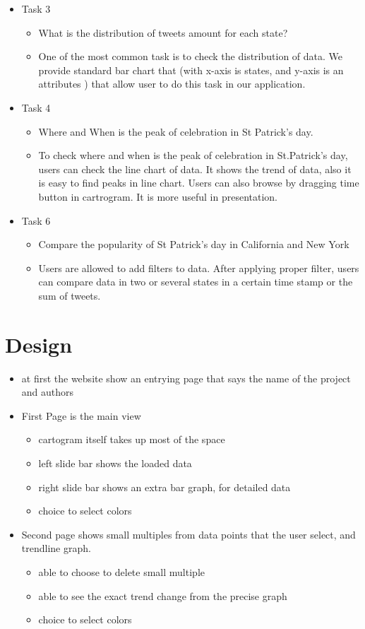 \documentclass[journal]{vgtc}                %
\begin{document}
\begin{itemize}
\item Task 3
\begin{itemize}
\item What is the distribution of tweets amount for each state?
\item One of the most common task is to check the distribution of data. We provide standard bar chart that (with x-axis is states, and y-axis is an attributes ) that allow user to do this task in our application. 
\end{itemize}
\item Task 4
\begin{itemize}
\item Where and When is the peak of celebration in St Patrick's day. 
\item To check where and when is the peak of celebration in St.Patrick's day, users can check the line chart of data. It shows the trend of data, also it is easy to find peaks in line chart. Users can also browse by dragging time button in cartrogram. It is more useful in presentation.
\end{itemize}
\item Task 6
\begin{itemize}
\item Compare the popularity of St Patrick's day in California and New York
\item Users are allowed to add filters to data. After applying proper filter, users can compare data in two or several states in a certain time stamp or the sum of tweets. 
\end{itemize}
\end{itemize}

\section{Design}
\begin{itemize}
\item at first the website show an entrying page that says the name of the project and authors
\item First Page is the main view
\begin{itemize}
\item cartogram itself takes up most of the space
\item left slide bar shows the loaded data
\item right slide bar shows an extra bar graph, for detailed data
\item choice to select colors
\end{itemize}
\item Second page shows small multiples from data points that the user select, and trendline graph.
\begin{itemize}
\item able to choose to delete small multiple
\item able to see the exact trend change from the precise graph
\item choice to select colors
\end{itemize}
\end{itemize}
\end{document}

